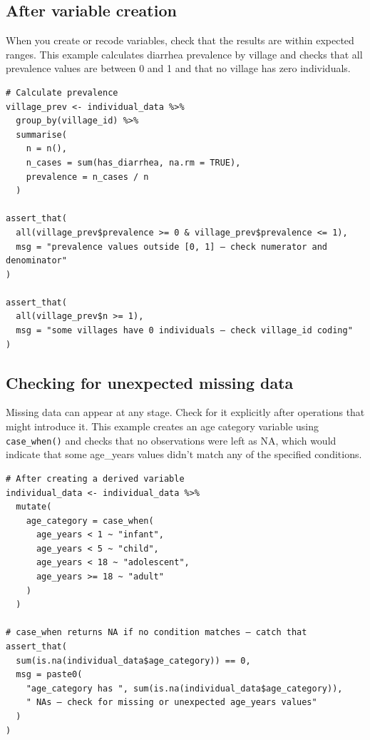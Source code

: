 \documentclass[
]{book}
\begin{document}
\subsection{After variable creation}\label{after-variable-creation}

When you create or recode variables, check that the results are within expected ranges. This example calculates diarrhea prevalence by village and checks that all prevalence values are between 0 and 1 and that no village has zero individuals.

\begin{verbatim}
# Calculate prevalence
village_prev <- individual_data %>%
  group_by(village_id) %>%
  summarise(
    n = n(),
    n_cases = sum(has_diarrhea, na.rm = TRUE),
    prevalence = n_cases / n
  )

assert_that(
  all(village_prev$prevalence >= 0 & village_prev$prevalence <= 1),
  msg = "prevalence values outside [0, 1] — check numerator and denominator"
)

assert_that(
  all(village_prev$n >= 1),
  msg = "some villages have 0 individuals — check village_id coding"
)
\end{verbatim}

\subsection{Checking for unexpected missing data}\label{checking-for-unexpected-missing-data}

Missing data can appear at any stage. Check for it explicitly after operations that might introduce it. This example creates an age category variable using \texttt{case\_when()} and checks that no observations were left as NA, which would indicate that some age\_years values didn't match any of the specified conditions.

\begin{verbatim}
# After creating a derived variable
individual_data <- individual_data %>%
  mutate(
    age_category = case_when(
      age_years < 1 ~ "infant",
      age_years < 5 ~ "child",
      age_years < 18 ~ "adolescent",
      age_years >= 18 ~ "adult"
    )
  )

# case_when returns NA if no condition matches — catch that
assert_that(
  sum(is.na(individual_data$age_category)) == 0,
  msg = paste0(
    "age_category has ", sum(is.na(individual_data$age_category)),
    " NAs — check for missing or unexpected age_years values"
  )
)
\end{verbatim}
\end{document}
